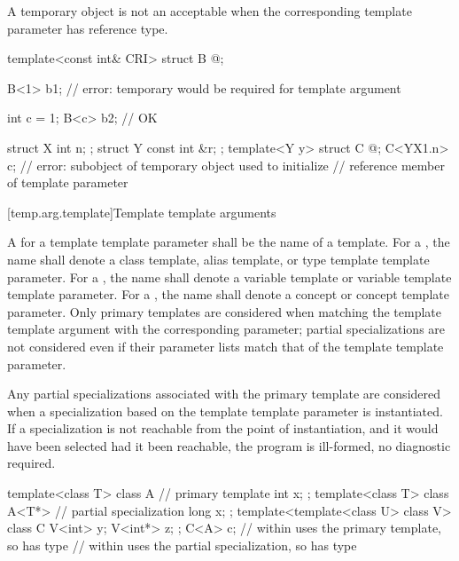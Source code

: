 \pnum
\begin{note}
A temporary object
is not an acceptable
when the corresponding
template parameter
has reference type.
\begin{example}
\begin{codeblock}
template<const int& CRI> struct B { @\commentellip@ };

B<1> b1;                        // error: temporary would be required for template argument

int c = 1;
B<c> b2;                        // OK

struct X { int n; };
struct Y { const int &r; };
template<Y y> struct C { @\commentellip@ };
C<Y{X{1}.n}> c;                 // error: subobject of temporary object used to initialize
                                // reference member of template parameter
\end{codeblock}
\end{example}
\end{note}

[temp.arg.template]{Template template arguments}

\pnum
A
for a template
template parameter
shall be the name of a template.
For a ,
the name shall denote a class template, alias template, or
type template template parameter.
For a ,
the name shall denote a variable template or
variable template template parameter.
For a ,
the name shall denote a concept or
concept template parameter.
Only primary templates are considered when matching the template template
argument with the corresponding parameter; partial specializations are not
considered even if their parameter lists match that of the template template
parameter.

\pnum
Any partial specializations associated with the
primary template are considered when a
specialization based on the template template parameter is instantiated.
If a specialization is not reachable from the point of instantiation,
and it would have been selected had it been reachable, the program is ill-formed,
no diagnostic required.
\begin{example}
\begin{codeblock}
template<class T> class A {     // primary template
  int x;
};
template<class T> class A<T*> { // partial specialization
  long x;
};
template<template<class U> class V> class C {
  V<int>  y;
  V<int*> z;
};
C<A> c;             //  within  uses the primary template, so  has type 
                    //  within  uses the partial specialization, so  has type 
\end{codeblock}
\end{example}


